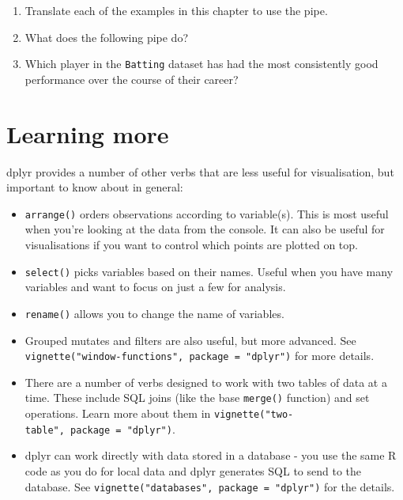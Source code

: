 \begin{enumerate}
\def\labelenumi{\arabic{enumi}.}
\item
  Translate each of the examples in this chapter to use the pipe.
\item
  What does the following pipe do?

\begin{Shaded}
\end{Shaded}
\item
  Which player in the \texttt{Batting} dataset has had the most
  consistently good performance over the course of their career?
\end{enumerate}

\section{Learning more}

dplyr provides a number of other verbs that are less useful for
visualisation, but important to know about in general:

\begin{itemize}
\item
  \texttt{arrange()} orders observations according to variable(s). This
  is most useful when you're looking at the data from the console. It
  can also be useful for visualisations if you want to control which
  points are plotted on top.
\item
  \texttt{select()} picks variables based on their names. Useful when
  you have many variables and want to focus on just a few for analysis.
\item
  \texttt{rename()} allows you to change the name of variables.
\item
  Grouped mutates and filters are also useful, but more advanced. See
  \texttt{vignette("window-functions",\ package\ =\ "dplyr")} for more
  details.
\item
  There are a number of verbs designed to work with two tables of data
  at a time. These include SQL joins (like the base \texttt{merge()}
  function) and set operations. Learn more about them in
  \texttt{vignette("two-table",\ package\ =\ "dplyr")}.
\item
  dplyr can work directly with data stored in a database - you use the
  same R code as you do for local data and dplyr generates SQL to send
  to the database. See
  \texttt{vignette("databases",\ package\ =\ "dplyr")} for the details.
\end{itemize}

